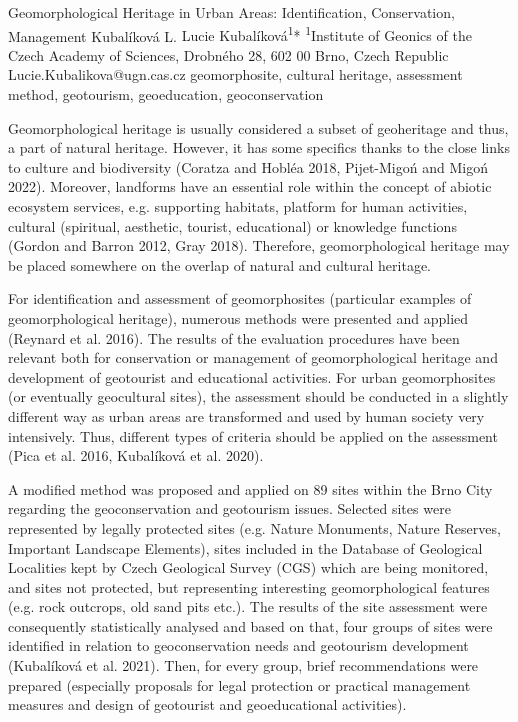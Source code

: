 \abstract
{Geomorphological Heritage in Urban Areas: Identification, Conservation, Management} 
{Kubalíková L.} 
{Lucie Kubalíková\textsuperscript{1}*} 
{\TLtag} 
{
\textsuperscript{1}Institute of Geonics of the Czech Academy of Sciences, Drobného 28, 602 00 Brno, Czech Republic
}
{Lucie.Kubalikova@ugn.cas.cz}  %
{geomorphosite, cultural heritage, assessment method, geotourism, geoeducation, geoconservation}
{
Geomorphological heritage is usually considered a subset of geoheritage and thus, a part of natural heritage. However, it has some specifics thanks to the close links to culture and biodiversity (Coratza and Hobléa 2018, Pijet-Migoń and Migoń 2022). Moreover, landforms have an essential role within the concept of abiotic ecosystem services, e.g. supporting habitats, platform for human activities, cultural (spiritual, aesthetic, tourist, educational) or knowledge functions (Gordon and Barron 2012, Gray 2018). Therefore, geomorphological heritage may be placed somewhere on the overlap of natural and cultural heritage. 

For identification and assessment of geomorphosites (particular examples of geomorphological heritage), numerous methods were presented and applied (Reynard et al. 2016). The results of the evaluation procedures have been relevant both for conservation or management of geomorphological heritage and development of geotourist and educational activities. For urban geomorphosites (or eventually geocultural sites), the assessment should be conducted in a slightly different way as urban areas are transformed and used by human society very intensively. Thus, different types of criteria should be applied on the assessment (Pica et al. 2016, Kubalíková et al. 2020).

A modified method was proposed and applied on 89 sites within the Brno City regarding the geoconservation and geotourism issues. Selected sites were represented by legally protected sites (e.g. Nature Monuments, Nature Reserves, Important Landscape Elements), sites included in the Database of Geological Localities kept by Czech Geological Survey (CGS) which are being monitored, and sites not protected, but representing interesting geomorphological features (e.g. rock outcrops, old sand pits etc.). The results of the site assessment were consequently statistically analysed and based on that, four groups of sites were identified in relation to geoconservation needs and geotourism development (Kubalíková et al. 2021). Then, for every group, brief recommendations were prepared (especially proposals for legal protection or practical management measures and design of geotourist and geoeducational activities).

}
